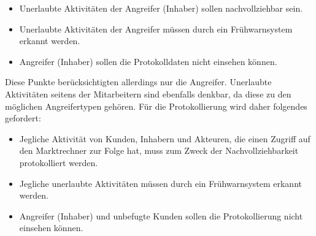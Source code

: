 \documentclass[11pt,a4paper]{report}
\begin{document}
\begin{itemize}[leftmargin=*]
\item Unerlaubte Aktivitäten der Angreifer (Inhaber) sollen nachvollziehbar sein.
\item Unerlaubte Aktivitäten der Angreifer müssen durch ein Frühwarnsystem erkannt werden.
\item Angreifer (Inhaber) sollen die Protokolldaten nicht einsehen können.
\end{itemize}

Diese Punkte berücksichtigten allerdings nur die Angreifer. Unerlaubte Aktivitäten seitens der Mitarbeitern sind ebenfalls denkbar, da diese zu den möglichen Angreifertypen gehören. Für die Protokollierung wird daher folgendes gefordert:

\begin{itemize}[leftmargin=*]
\item Jegliche Aktivität von Kunden, Inhabern und Akteuren, die einen Zugriff auf den Marktrechner zur Folge hat, muss zum Zweck der Nachvollziehbarkeit protokolliert werden.
\item Jegliche unerlaubte Aktivitäten müssen durch ein Frühwarnsystem erkannt werden.
\item Angreifer (Inhaber) und unbefugte Kunden sollen die Protokollierung nicht einsehen können.
\end{itemize}
\end{document}
